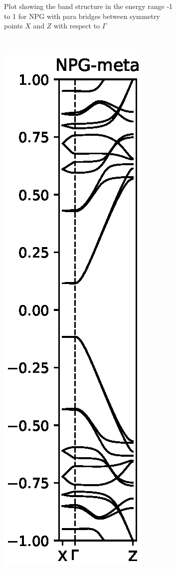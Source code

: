 \begin{figure}
\begin{subfigure}[b]{0.3\textwidth}
        \caption{Plot showing the band structure in the energy range -1 to 1 for NPG with para bridges between symmetry points \(X\) and \(Z\) with respect to \(\Gamma\)}
        \label{parabs}
    \end{subfigure}
    ~ %
    \begin{subfigure}[b]{0.3\textwidth}
        \includegraphics[width=\textwidth]{Figures/metaNPGBS.eps}

\end{subfigure}
\end{figure}
